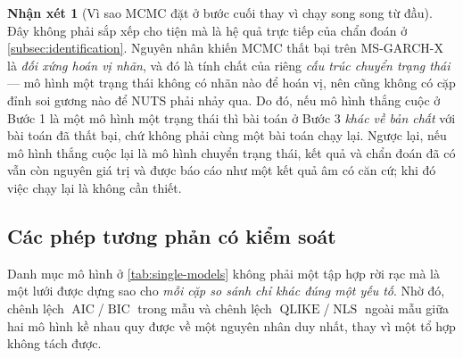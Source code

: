 \documentclass[12pt,a4paper]{article}
\numberwithin{equation}{section}
\theoremstyle{definition}
\newtheorem{remark}{Nhận xét}[section]
\newcommand{\AIC}{\operatorname{AIC}}
\newcommand{\BIC}{\operatorname{BIC}}
\newcommand{\QLIKE}{\operatorname{QLIKE}}
\newcommand{\NLS}{\operatorname{NLS}}
\begin{document}
	\begin{remark}[Vì sao MCMC đặt ở bước cuối thay vì chạy song song từ đầu]\label{rem:mcmc-cuoi}
		Đây không phải sắp xếp cho tiện mà là hệ quả trực tiếp của chẩn đoán ở
		\cref{subsec:identification}. Nguyên nhân khiến MCMC thất bại trên MS-GARCH-X là
		\emph{đối xứng hoán vị nhãn}, và đó là tính chất của riêng \emph{cấu trúc chuyển trạng
		thái} --- mô hình một trạng thái không có nhãn nào để hoán vị, nên cũng không có cặp
		đỉnh soi gương nào để NUTS phải nhảy qua. Do đó, nếu mô hình thắng cuộc ở Bước 1 là một
		mô hình một trạng thái thì bài toán ở Bước 3 \emph{khác về bản chất} với bài toán đã
		thất bại, chứ không phải cùng một bài toán chạy lại. Ngược lại, nếu mô hình thắng cuộc
		lại là mô hình chuyển trạng thái, kết quả và chẩn đoán đã có vẫn còn nguyên giá trị và
		được báo cáo như một kết quả âm có căn cứ; khi đó việc chạy lại là không cần thiết.
	\end{remark}

	\subsection{Các phép tương phản có kiểm soát}\label{subsec:contrasts}
	Danh mục mô hình ở \cref{tab:single-models} không phải một tập hợp rời rạc mà là một lưới
	được dựng sao cho \emph{mỗi cặp so sánh chỉ khác đúng một yếu tố}. Nhờ đó, chênh lệch
	$\AIC$/$\BIC$ trong mẫu và chênh lệch $\QLIKE$/$\NLS$ ngoài mẫu giữa hai mô hình kề nhau
	quy được về một nguyên nhân duy nhất, thay vì một tổ hợp không tách được.
\end{document}

